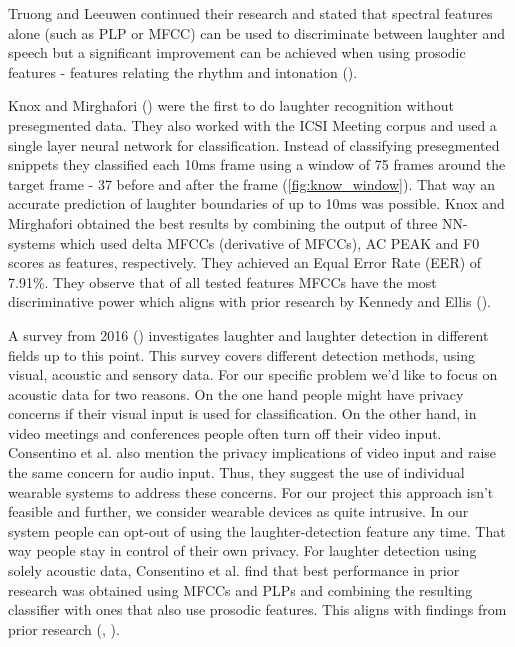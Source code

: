 \documentclass[bsc,frontabs,parskip,deptreport]{infthesis}
\begin{document}
Truong and Leeuwen continued their research and stated that spectral features alone (such as PLP or MFCC) can be used to discriminate between laughter and speech but a significant improvement can be achieved when using prosodic features - features relating the rhythm and intonation (\cite{truong2007automatic}).

Knox and Mirghafori (\cite{knox2006automatic}) were the first to do laughter recognition without presegmented data. They also worked with the ICSI Meeting corpus and used a single layer neural network for classification. Instead of classifying presegmented snippets they classified each 10ms frame using a window of 75 frames around the target frame - 37 before and after the frame (\ref{fig:know_window}). That way an accurate prediction of laughter boundaries of up to 10ms was possible. 
Knox and Mirghafori obtained the best results by combining the output of three NN-systems which used delta MFCCs (derivative of MFCCs), AC PEAK and F0 scores as features, respectively. They achieved an Equal Error Rate (EER) of 7.91\%. They observe that of all tested features MFCCs have the most discriminative power which aligns with prior research by Kennedy and Ellis (\cite{kennedy2004laughter}).

A survey from 2016 (\cite{cosentino2016quantitative}) investigates laughter and laughter detection in different fields up to this point. This survey covers different detection methods, using visual, acoustic and sensory data. For our specific problem we'd like to focus on acoustic data for two reasons. On the one hand people might have privacy concerns if their visual input is used for classification. On the other hand, in video meetings and conferences people often turn off their video input. Consentino et al. also mention the privacy implications of video input and raise the same concern for audio input. Thus, they suggest the use of individual wearable systems to address these concerns. For our project this approach isn't feasible and further, we consider wearable devices as quite intrusive. In our system people can opt-out of using the laughter-detection feature any time. That way people stay in control of their own privacy.
For laughter detection using solely acoustic data, Consentino et al. find that best performance in prior research was obtained using MFCCs and PLPs and combining the resulting classifier with ones that also use prosodic features. This aligns with findings from prior research (\cite{truong2007automatic}, \cite{knox2006automatic}).
\end{document}
